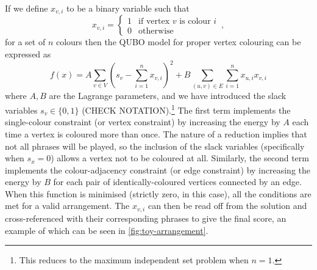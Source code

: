 \documentclass[12pt]{article}
\theoremstyle{definition}
\begin{document}
If we define $x_{v,i}$ to be a binary variable such that
\begin{equation}
    x_{v,i} =
    \begin{cases}
        1 & \text{if vertex $v$ is colour $i$} \\
        0 & \text{otherwise}
    \end{cases}
    \,,
\end{equation}
for a set of $n$ colours then the QUBO model for proper vertex colouring can be expressed as
\begin{equation}
    f(x)=A\sum_{v \in V}\left(s_v-\sum_{i=1}^{n} x_{v,i}\right)^2+B\sum_{(u,v) \in E}\sum_{i=1}^n x_{u,i}x_{v,i}
    \label{eq:MIS}
\end{equation}
where $A,B$ are the Lagrange parameters, and we have introduced the slack variables $s_v\in\{0,1\}$ (CHECK NOTATION).\footnote{This reduces to the maximum independent set problem when $n=1$.} The first term implements the single-colour constraint (or vertex constraint) by increasing the energy by $A$ each time a vertex is coloured more than once. The nature of a reduction implies that not all phrases will be played, so the inclusion of the slack variables (specifically when $s_x=0$) allows a vertex not to be coloured at all. Similarly, the second term implements the colour-adjacency constraint (or edge constraint) by increasing the energy by $B$ for each pair of identically-coloured vertices connected by an edge. When this function is minimised (strictly zero, in this case), all the conditions are met for a valid arrangement. The $x_{v,i}$ can then be read off from the solution and cross-referenced with their corresponding phrases to give the final score, an example of which can be seen in \cref{fig:toy-arrangement}.
\end{document}
